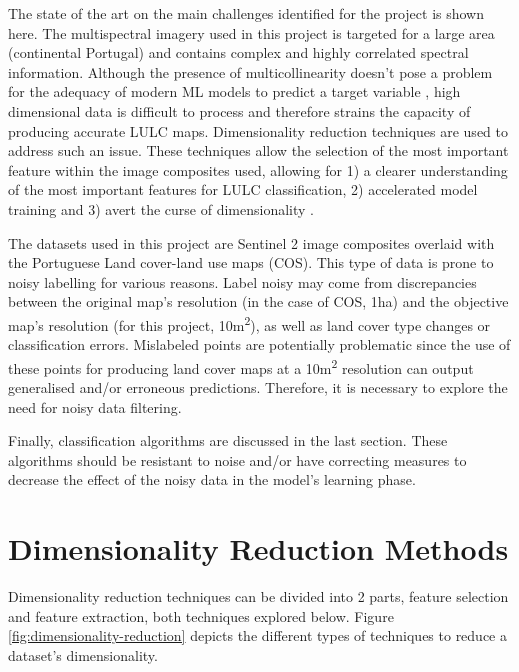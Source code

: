 \documentclass[12pt, english, openany]{book}
\begin{document}
The state of the art on the main challenges identified for the project is shown
here. The multispectral imagery used in this project is targeted for a large
area (continental Portugal) and contains complex and highly correlated spectral
information. Although the presence of multicollinearity doesn't pose a problem
for the adequacy of modern ML models to predict a target variable
\cite{Farrell2019}, high dimensional data is difficult to process and therefore
strains the capacity of producing accurate LULC maps. Dimensionality reduction
techniques are used to address such an issue. These techniques allow the
selection of the most important feature within the image composites used,
allowing for 1) a clearer understanding of the most important features for LULC
classification, 2) accelerated model training and 3) avert the curse of
dimensionality \cite{Ghojogh2019}.


The datasets used in this project are Sentinel 2 image composites overlaid with
the Portuguese Land cover-land use maps (COS). This
type of data is prone to noisy labelling for various reasons. Label noisy may
come from discrepancies between the original map's resolution (in the case of
COS, 1ha) and the objective map's resolution (for this project,
10m\textsuperscript{2}), as well as land cover type changes or classification
errors. %
Mislabeled points are potentially problematic since the use of these points for
producing land cover maps at a 10m\textsuperscript{2} resolution can output
generalised and/or erroneous predictions. Therefore, it is necessary to
explore the need for noisy data filtering.

Finally, classification algorithms are discussed in the last section. These
algorithms should be resistant to noise and/or have correcting measures to
decrease the effect of the noisy data in the model's learning phase.

\section{Dimensionality Reduction Methods} \label{sec:dimensionality-reduction-LR}
Dimensionality reduction techniques can be divided into 2 parts, feature
selection and feature extraction, both techniques explored below. Figure
\ref{fig:dimensionality-reduction} depicts the different types of techniques to
reduce a dataset's dimensionality.
\end{document}
